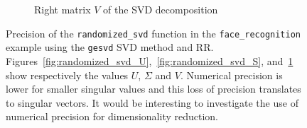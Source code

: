 \documentclass[10pt,journal,compsoc]{IEEEtran}
\begin{document}
\begin{figure}
\begin{subfigure}{0.3\linewidth}
        \caption{Right matrix $V$ of the SVD decomposition}
        \label{fig:randomized_svd_V}
    \end{subfigure}
    \caption{Precision of the \texttt{randomized\_svd} function in the
        \texttt{face\_recognition} example using the \texttt{gesvd} SVD method and RR.
        Figures~\ref{fig:randomized_svd_U},~\ref{fig:randomized_svd_S}, and~\ref{fig:randomized_svd_V}
        show respectively the values $U$, $\Sigma$ and $V$.
        Numerical precision is lower for smaller singular values and this loss of precision translates to singular vectors. It would be interesting to investigate the use of numerical precision for dimensionality reduction.
    }
    \label{fig:face_recognition_svd}
\end{figure}








\end{document}

